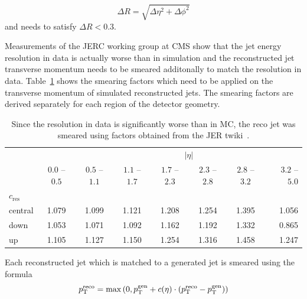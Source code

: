 \begin{equation}
\Delta R = \sqrt{\Delta \eta^2 + \Delta \phi^2}
\end{equation}
and needs to satisfy $\Delta R < 0.3$.

Measurements of the JERC working group at CMS show that the jet energy
resolution in data is actually worse than in simulation and the reconstructed
jet transverse momentum needs to be smeared additonally to match the resolution
in data. Table~\ref{tab:res_smearing} shows the smearing factors which need to
be applied on the transverse momentum of simulated reconstructed jets. The
smearing factors are derived separately for each region of the detector geometry.

\begin{table}[htbp]
\setlength\tabcolsep{4.5pt} 
    \centering
    \caption[Jet energy resolution scale factors]{Since the resolution in data is significantly
             worse than in MC, the reco jet \pt was smeared using factors obtained from the
             JER twiki~\cite{JERC:Resolution}.}
    \label{tab:res_smearing}

    \begin{tabular}{lccccccr}
    \toprule
    & & \multicolumn{6}{c}{$|\eta|$}\\\cmidrule{2-8}
               & $0.0$ -- $0.5$ & $0.5$ -- $1.1$ & $1.1$ -- $1.7$ & $1.7$ --
               $2.3$ & $2.3$ -- $2.8$ & $2.8$ -- $3.2$ & $3.2$ -- $5.0$\\
               $c_\text{res}$ &  &  &  & & & & \\\cmidrule{1-1}
    central    & 1.079                   & 1.099                   & 1.121    & 1.208                   & 1.254                   & 1.395    & 1.056\\
    down       & 1.053                   & 1.071                   & 1.092    & 1.162                   & 1.192                   & 1.332 & 0.865\\
    up         & 1.105                   & 1.127                   & 1.150 & 1.254                   & 1.316                   & 1.458 & 1.247\\
    \bottomrule
    \end{tabular}
\end{table}

Each reconstructed jet which is matched to a generated jet is smeared  using the formula
\begin{equation}
p_{\mathrm{T}}^{\text{reco}} = \max \left( 0, p_{\mathrm{T}}^{\text{gen}} + c(\eta) \cdot (p_{\mathrm{T}}^{\text{reco}} - p_{\mathrm{T}}^{\text{gen}}) \right)
\end{equation}


